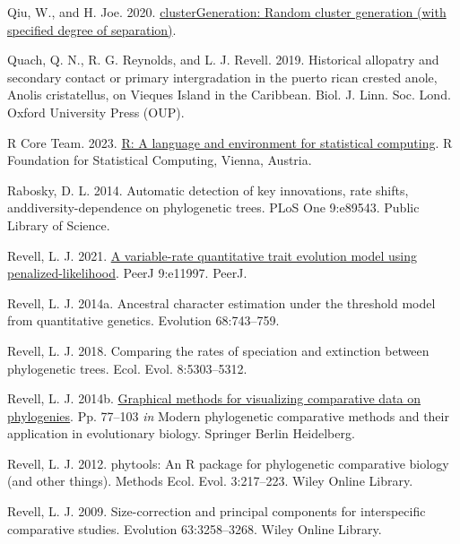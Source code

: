 \documentclass[fleqn,10pt,lineno]{wlpeerj} %
\newlength{\cslhangindent}
\newlength{\cslentryspacingunit} %
\newenvironment{CSLReferences}[2] %
 {%
  \setlength{\parindent}{0pt}
  \ifodd #1
  \let\oldpar\par
  \def\par{\hangindent=\cslhangindent\oldpar}
  \fi
  \setlength{\parskip}{#2\cslentryspacingunit}
 }%
 {}
\begin{document}
\begin{CSLReferences}{1}{0}
\leavevmode{}%
Qiu, W., and H. Joe. 2020. \href{https://CRAN.R-project.org/package=clusterGeneration}{clusterGeneration: Random cluster generation (with specified degree of separation)}.

\leavevmode{}%
Quach, Q. N., R. G. Reynolds, and L. J. Revell. 2019. Historical allopatry and secondary contact or primary intergradation in the puerto rican crested anole, {Anolis cristatellus}, on {V}ieques {I}sland in the {C}aribbean. Biol. J. Linn. Soc. Lond. Oxford University Press (OUP).

\leavevmode{}%
R Core Team. 2023. \href{https://www.R-project.org/}{R: A language and environment for statistical computing}. R Foundation for Statistical Computing, Vienna, Austria.

\leavevmode{}%
Rabosky, D. L. 2014. Automatic detection of key innovations, rate shifts, and{d}iversity-{d}ependence on phylogenetic trees. PLoS One 9:e89543. Public Library of Science.

\leavevmode{}%
Revell, L. J. 2021. \href{https://doi.org/10.7717/peerj.11997}{A variable-rate quantitative trait evolution model using penalized-likelihood}. {PeerJ} 9:e11997. {PeerJ}.

\leavevmode{}%
Revell, L. J. 2014a. Ancestral character estimation under the threshold model from quantitative genetics. Evolution 68:743--759.

\leavevmode{}%
Revell, L. J. 2018. Comparing the rates of speciation and extinction between phylogenetic trees. Ecol. Evol. 8:5303--5312.

\leavevmode{}%
Revell, L. J. 2014b. \href{https://doi.org/10.1007/978-3-662-43550-2_4}{Graphical methods for visualizing comparative data on phylogenies}. Pp. 77--103 \emph{in} Modern phylogenetic comparative methods and their application in evolutionary biology. Springer Berlin Heidelberg.

\leavevmode{}%
Revell, L. J. 2012. {phytools}: An {R} package for phylogenetic comparative biology (and other things). Methods Ecol. Evol. 3:217--223. Wiley Online Library.

\leavevmode{}%
Revell, L. J. 2009. Size-correction and principal components for interspecific comparative studies. Evolution 63:3258--3268. Wiley Online Library.


\end{CSLReferences}
\end{document}
